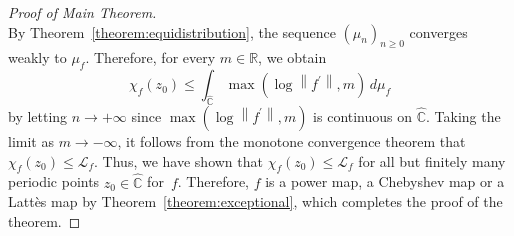 \begin{proof}[Proof of Main Theorem]
\[\]
By Theorem~\ref{theorem:equidistribution}, the sequence $\left(\mu_{n} \right)_{n \geq 0}$ converges weakly to $\mu_{f}$. Therefore, for every $m \in \mathbb{R}$, we obtain
\[
\chi_{f}(z_{0}) \leq \int_{\widehat{\mathbb{C}}} \max\left(\log\left\lVert f^{\prime} \right\rVert, m \right) \, d\mu_{f}
\]
by letting $n \to +\infty$ since $\max\left(\log\left\lVert f^{\prime} \right\rVert, m \right)$ is continuous on $\widehat{\mathbb{C}}$. Taking the limit as $m \to -\infty$, it follows from the monotone convergence theorem that $\chi_{f}(z_{0}) \leq \mathcal{L}_{f}$. Thus, we have shown that $\chi_{f}(z_{0}) \leq \mathcal{L}_{f}$ for all but finitely many periodic points $z_{0} \in \widehat{\mathbb{C}}$ for~$f$. Therefore, $f$ is a power map, a Chebyshev map or a Lattès map by Theorem~\ref{theorem:exceptional}, which completes the proof of the theorem.
\end{proof}

\Changelback

